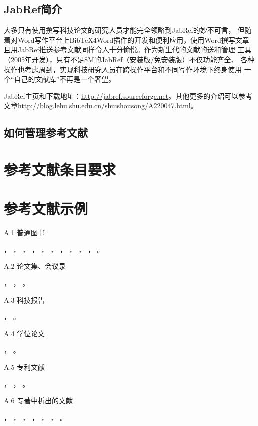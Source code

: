 \subsection{JabRef简介}
大多只有使用\latex{}撰写科技论文的研究人员才能完全领略到JabRef的妙不可言，
但随着对Word写作平台上BibTeX4Word插件的开发和便利应用，使用Word撰写文章
且用JabRef推送参考文献同样令人十分愉悦。作为新生代的文献的送和管理
工具（2005年开发），只有不足8M的JabRef（安装版/免安装版）不仅功能齐全、
各种操作也考虑周到，实现科技研究人员在跨操作平台和不同写作环境下终身使用
一个“自己的文献库”不再是一个奢望。

JabRef主页和下载地址：\url{http://jabref.sourceforge.net}。其他更多的介绍可以参考文章\url{http://blog.lehu.shu.edu.cn/shuishousong/A220047.html}。
\subsection{如何管理参考文献}

\section{参考文献条目要求}

\section{参考文献示例}
A.1 普通图书

，
，
，
，
，
，
，
，
，
，
。

A.2 论文集、会议录

，
，
。

A.3 科技报告

，
。

A.4 学位论文

，
。

A.5 专利文献

，
，
。

A.6 专著中析出的文献

，
，
，
，
，
，
。

